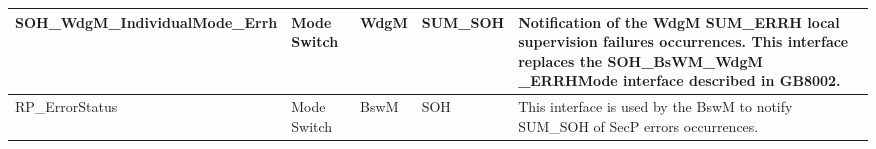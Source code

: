 \begin{longtable}{|l|l|l|l|l|}
\begin{minipage}{0.39\linewidth}\raggedright\vspace{.75ex}SOH\_WdgM\_IndividualMode\_Errh\vspace{.75ex}\end{minipage} & \begin{minipage}{0.07\linewidth}\raggedright\vspace{.75ex}Mode Switch\vspace{.75ex}\end{minipage} & \begin{minipage}{0.11\linewidth}\raggedright\vspace{.75ex}WdgM\vspace{.75ex}\end{minipage} & \begin{minipage}{0.11\linewidth}\raggedright\vspace{.75ex}SUM\_SOH\vspace{.75ex}\end{minipage} & \begin{minipage}{0.16\linewidth}\raggedright\vspace{.75ex}Notification of the WdgM SUM\_ERRH local supervision failures occurrences. \newline \footnotesize{This interface replaces the SOH\_BsWM\_WdgM \_ERRHMode interface described in GB8002.}\vspace{.75ex}\end{minipage}\\\hline
\begin{minipage}{0.39\linewidth}\raggedright\vspace{.75ex}RP\_ErrorStatus\vspace{.75ex}\end{minipage} & \begin{minipage}{0.07\linewidth}\raggedright\vspace{.75ex}Mode Switch\vspace{.75ex}\end{minipage} & \begin{minipage}{0.11\linewidth}\raggedright\vspace{.75ex}BswM\vspace{.75ex}\end{minipage} & \begin{minipage}{0.11\linewidth}\raggedright\vspace{.75ex}SOH\vspace{.75ex}\end{minipage} & \begin{minipage}{0.16\linewidth}\raggedright\vspace{.75ex}This interface is used by the BswM to notify SUM\_SOH of SecP errors occurrences.\vspace{.75ex}\end{minipage}\\\hline

\end{longtable}
